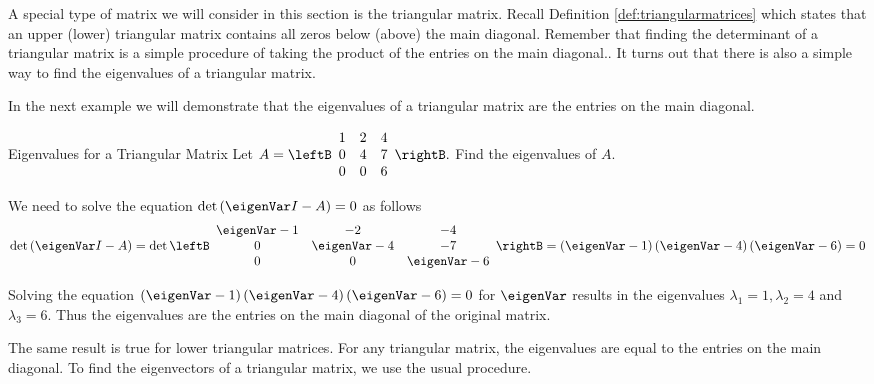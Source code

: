 A special type of matrix we will consider in this section is
the triangular matrix.  Recall Definition \ref{def:triangularmatrices}
which states that an upper (lower) triangular matrix contains all
zeros below (above) the main diagonal. Remember that finding the
determinant of a triangular matrix is a simple procedure of taking the product of the entries on the main diagonal.. It turns out
that there is also a simple way to find the eigenvalues of a
triangular matrix.

In the next example we will demonstrate that the eigenvalues of a 
triangular matrix are the entries on the main diagonal. 

\begin{example}{Eigenvalues for a Triangular Matrix}\label{exa:eigenvaluestriangularmatrix}
Let $A=\leftB
\begin{array}{rrr}
1 & 2 & 4 \\
0 & 4 & 7 \\
0 & 0 & 6
\end{array}
\rightB .$ Find the eigenvalues of $A$.
\end{example}

\begin{solution}
We need to solve the equation $\det \left( \eigenVar I - A \right) = 0$ as follows
\begin{eqnarray*}
\det \left( \eigenVar I - A \right) =
\det \leftB
\begin{array}{ccc}
\eigenVar -1 & -2 & -4 \\
0 & \eigenVar-4 & -7 \\
0 & 0 & \eigenVar-6
\end{array}
\rightB =\left( \eigenVar-1 \right) \left( \eigenVar-4 \right) \left( \eigenVar-6 \right) =0
\end{eqnarray*}

Solving the equation $\left( \eigenVar-1 \right) \left( \eigenVar-4
\right) \left( \eigenVar-6 \right) = 0$ for $\eigenVar$ results in the eigenvalues 
$\lambda_1 = 1, \lambda_2 = 4$ and $\lambda_3 = 6$.  Thus the
eigenvalues are the entries on the main diagonal of the original
matrix.
\end{solution}

The same result is true for lower triangular matrices. For any triangular matrix,
the eigenvalues are equal to the entries on the main diagonal. To find the 
eigenvectors of a triangular matrix, we use the usual procedure. 


